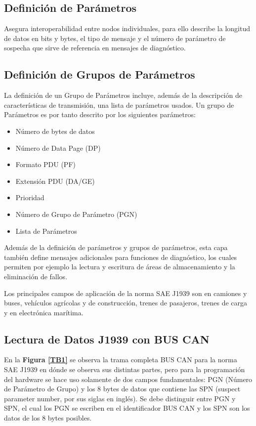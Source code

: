 \subsection{Definición de Parámetros}

Asegura interoperabilidad entre nodos individuales, para ello describe la longitud de datos en bits y bytes, el tipo de mensaje y el número de parámetro de sospecha que sirve de referencia en mensajes de diagnóstico.

\subsection{Definición de Grupos de Parámetros}

La definición de un Grupo de Parámetros incluye, además de la descripción de características de transmisión, una lista de parámetros usados.
Un grupo de Parámetros es por tanto descrito por los siguientes parámetros:
\begin{itemize}
\item Número de bytes de datos
\item Número de Data Page (DP)
\item Formato PDU (PF)
\item Extensión PDU (DA/GE)
\item Prioridad
\item Número de Grupo de Parámetro (PGN)
\item Lista de Parámetros
\end{itemize}

Además de la definición de parámetros y grupos de parámetros, esta capa también define mensajes adicionales para funciones de diagnóstico, los cuales permiten por ejemplo la lectura y escritura de áreas de almacenamiento y la eliminación de fallos.

Los principales campos de aplicación de la norma SAE J1939 son en camiones y buses, vehículos agrícolas y de construcción, trenes de pasajeros, trenes de carga y en electrónica marítima.


\subsection{Lectura de Datos J1939 con BUS CAN}

En la \textbf{Figura \ref{TB1}} se observa la trama completa BUS CAN para la norma SAE J1939 en dónde se observa sus distintas partes, pero para la programación del hardware se hace uso solamente de dos campos fundamentales: PGN (Número de Parámetro de Grupo) y los 8 bytes de datos que contiene las SPN (suspect parameter number, por sus siglas en inglés).
Se debe distinguir entre PGN y SPN, el cual los PGN se escriben en el identificador BUS CAN y los SPN son los datos de los 8 bytes posibles. 


